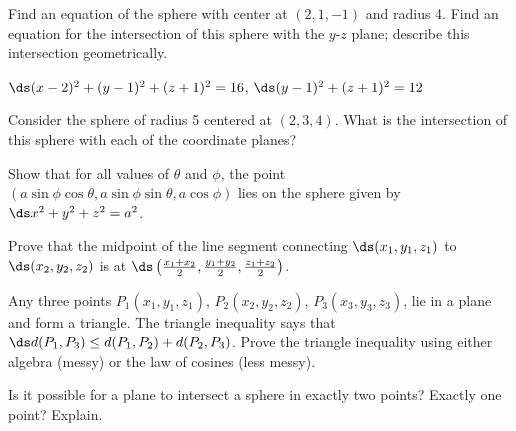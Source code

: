 \begin{exercises}
\exercise Find an equation of the sphere with center at $(2,1,-1)$ and
radius 4. Find an equation for the intersection of this sphere with
the $y$-$z$ plane; describe this intersection geometrically.
\begin{answer} $\ds (x-2)^2+(y-1)^2+(z+1)^2=16$,
$\ds (y-1)^2+(z+1)^2=12$
\end{answer}

\exercise Consider the sphere of radius 5 centered at $(2,3,4)$.  What is
the intersection of this sphere with each of the coordinate planes?

\exercise Show that for all values of $\theta$ and $\phi$, the point
$(a\sin\phi\cos\theta,a\sin\phi\sin\theta,a\cos\phi)$ lies on the
sphere given by $\ds x^2+y^2+z^2=a^2$.

\exercise Prove that the midpoint of the line segment connecting
$\ds (x_1,y_1,z_1)$ to $\ds (x_2,y_2,z_2)$ is at 
$\ds\left({x_1+x_2\over 2},{y_1+y_2\over 2},{z_1+z_2\over 2}\right)$.

\exercise Any three points $P_1(x_1,y_1,z_1)$, $P_2(x_2,y_2,z_2)$,
$P_3(x_3,y_3,z_3)$, lie in a plane and form a triangle.  The {\dfont
triangle inequality\/} says that $\ds
d(P_1,P_3)\le d(P_1,P_2)+d(P_2,P_3)$.  Prove the triangle inequality
using either algebra (messy) or the law of cosines (less messy).

\exercise Is it possible for a plane to intersect a sphere in exactly two
points?  Exactly one point? Explain.  

\end{exercises}
